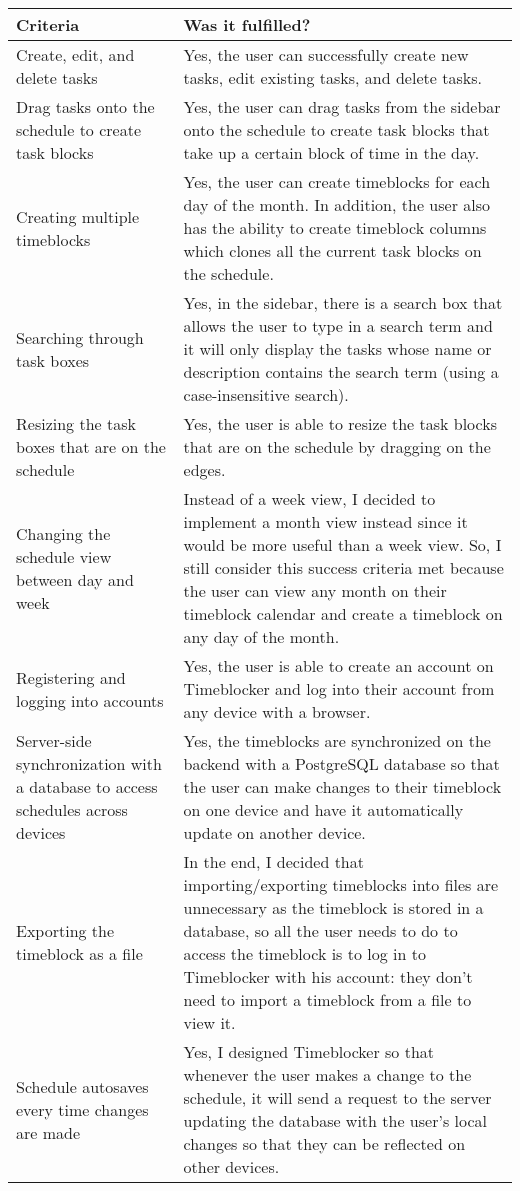 \documentclass[12pt]{report}
\begin{document}
\def\arraystretch{1.5}
\begin{xltabular}{\textwidth}{|X|X|}
	\hline
	\textbf{Criteria}
	&
	\textbf{Was it fulfilled?}
	\\\hline
	Create, edit, and delete tasks
	&
	Yes, the user can successfully create new tasks, edit existing tasks, and delete tasks.
	\\\hline
	Drag tasks onto the schedule to create task blocks
	&
	Yes, the user can drag tasks from the sidebar onto the schedule to create task blocks that take up a certain block of time in the day.
	\\\hline
	Creating multiple timeblocks
	&
	Yes, the user can create timeblocks for each day of the month. In addition, the user also has the ability to create timeblock columns which clones all the current task blocks on the schedule.
	\\\hline
	Searching through task boxes
	&
	Yes, in the sidebar, there is a search box that allows the user to type in a search term and it will only display the tasks whose name or description contains the search term (using a case-insensitive search).
	\\\hline
	Resizing the task boxes that are on the schedule
	&
	Yes, the user is able to resize the task blocks that are on the schedule by dragging on the edges.
	\\\hline
	Changing the schedule view between day and week
	&
	Instead of a week view, I decided to implement a month view instead since it would be more useful than a week view. So, I still consider this success criteria met because the user can view any month on their timeblock calendar and create a timeblock on any day of the month.
	\\\hline
	Registering and logging into accounts
	&
	Yes, the user is able to create an account on Timeblocker and log into their account from any device with a browser.
	\\\hline
	Server-side synchronization with a database to access schedules across devices
	&
	Yes, the timeblocks are synchronized on the backend with a PostgreSQL database so that the user can make changes to their timeblock on one device and have it automatically update on another device.
	\\\hline
	Exporting the timeblock as a file
	&
	In the end, I decided that importing/exporting timeblocks into files are unnecessary as the timeblock is stored in a database, so all the user needs to do to access the timeblock is to log in to Timeblocker with his account: they don't need to import a timeblock from a file to view it.
	\\\hline
	Schedule autosaves every time changes are made
	&
	Yes, I designed Timeblocker so that whenever the user makes a change to the schedule, it will send a request to the server updating the database with the user's local changes so that they can be reflected on other devices.
	\\\hline
\end{xltabular}
\end{document}

